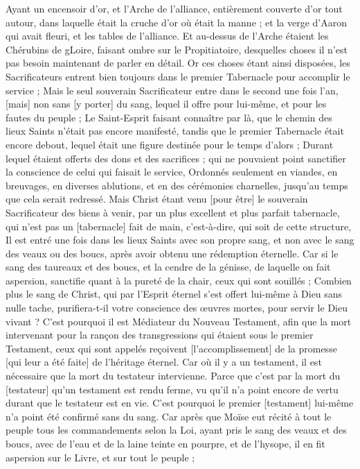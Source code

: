 \begin{multicols}{2}
Ayant un encensoir d'or, et l'Arche de l'alliance, entièrement couverte d'or tout autour, dans laquelle était la cruche d'or où était la manne ; et la verge d'Aaron qui avait fleuri, et les tables de l'alliance.
Et au-dessus de l'Arche étaient les Chérubins de gLoire, faisant ombre sur le Propitiatoire, desquelles choses il n'est pas besoin maintenant de parler en détail.
Or ces choses étant ainsi disposées, les Sacrificateurs entrent bien toujours dans le premier Tabernacle pour accomplir le service ;
Mais le seul souverain Sacrificateur entre dans le second une fois l'an, [mais] non sans [y porter] du sang, lequel il offre pour lui-même, et pour les fautes du peuple ;
Le Saint-Esprit faisant connaître par là, que le chemin des lieux Saints n'était pas encore manifesté, tandis que le premier Tabernacle était encore debout, lequel était une figure destinée pour le temps d'alors ;
Durant lequel étaient offerts des dons et des sacrifices ; qui ne pouvaient point sanctifier la conscience de celui qui faisait le service,
Ordonnés seulement en viandes, en breuvages, en diverses ablutions, et en des cérémonies charnelles, jusqu'au temps que cela serait redressé.
Mais Christ étant venu [pour être] le souverain Sacrificateur des biens à venir, par un plus excellent et plus parfait tabernacle, qui n'est pas un [tabernacle] fait de main, c'est-à-dire, qui soit de cette structure,
Il est entré une fois dans les lieux Saints avec son propre sang, et non avec le sang des veaux ou des boucs, après avoir obtenu une rédemption éternelle.
Car si le sang des taureaux et des boucs, et la cendre de la génisse, de laquelle on fait aspersion, sanctifie quant à la pureté de la chair, ceux qui sont souillés ;
Combien plus le sang de Christ, qui par l'Esprit éternel s'est offert lui-même à Dieu sans nulle tache, purifiera-t-il votre conscience des œuvres mortes, pour servir le Dieu vivant ?
C'est pourquoi il est Médiateur du Nouveau Testament, afin que la mort intervenant pour la rançon des transgressions qui étaient sous le premier Testament, ceux qui sont appelés reçoivent [l'accomplissement] de la promesse [qui leur a été faite] de l'héritage éternel.
Car où il y a un testament, il est nécessaire que la mort du testateur intervienne.
Parce que c'est par la mort du [testateur] qu'un testament est rendu ferme, vu qu'il n'a point encore de vertu durant que le testateur est en vie.
C'est pourquoi le premier [testament] lui-même n'a point été confirmé sans du sang.
Car après que Moïse eut récité à tout le peuple tous les commandements selon la Loi, ayant pris le sang des veaux et des boucs, avec de l'eau et de la laine teinte en pourpre, et de l'hysope, il en fit aspersion sur le Livre, et sur tout le peuple ;

\end{multicols}
